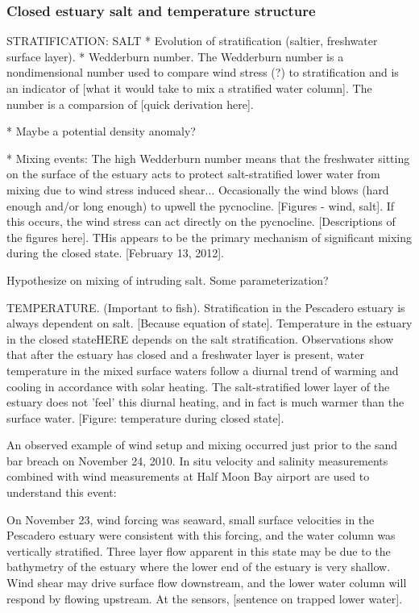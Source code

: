 \subsubsection{Closed estuary salt and temperature structure} \label{cl_strat}
STRATIFICATION: SALT * Evolution of stratification (saltier, freshwater
surface layer). * Wedderburn number. The Wedderburn number is a
nondimensional number used to compare wind stress (?) to stratification
and is an indicator of [what it would take to mix a stratified water
column]. The number is a comparsion of [quick derivation here].


* Maybe a potential density anomaly?


* Mixing events: The high Wedderburn number means that the freshwater
sitting on the surface of the estuary acts to protect salt-stratified
lower water from mixing due to wind stress induced shear... Occasionally
the wind blows (hard enough and/or long enough) to upwell the
pycnocline. [Figures - wind, salt]. If this occurs, the wind stress can
act directly on the pycnocline. [Descriptions of the figures here]. 
THis appears to be the primary mechanism of significant mixing during
the closed state.  [February 13, 2012].



Hypothesize on mixing of intruding salt. Some parameterization?

TEMPERATURE. (Important to fish). Stratification in the Pescadero
estuary is always dependent on salt. [Because equation of state].
Temperature in the estuary in the closed state{HERE} depends on the salt
stratification. Observations show that after the estuary has closed and
a freshwater layer is present, water temperature in the mixed surface
waters follow a diurnal trend of warming and cooling in accordance with
solar heating. The salt-stratified lower layer of the estuary does not
'feel' this diurnal heating, and in fact is much warmer than the surface
water. [Figure: temperature during closed state].


An observed example of wind setup and mixing occurred just prior to the
sand bar breach on November 24, 2010. In situ velocity and salinity
measurements combined with wind measurements at Half Moon Bay airport
are used to understand this event:

On November 23, wind forcing was seaward, small surface velocities in
the Pescadero estuary were consistent with this forcing, and the water
column was vertically stratified. Three layer flow apparent in this
state may be due to the bathymetry of the estuary where the lower end of
the estuary is very shallow. Wind shear may drive surface flow
downstream, and the lower water column will respond by flowing upstream.
At the sensors, [sentence on trapped lower water].

